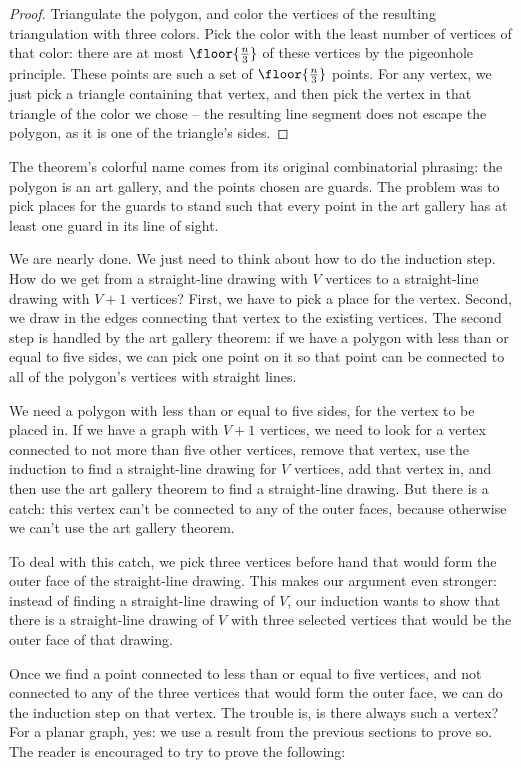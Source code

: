 \documentclass[11pt,paper=letter]{scrartcl}
\begin{document}
\begin{proof}
Triangulate the polygon, and color the vertices of the resulting triangulation with three colors. Pick the color with the least number of vertices of that color: there are at most $\floor{\frac{n}{3}}$ of these vertices by the pigeonhole principle. These points are such a set of $\floor{\frac{n}{3}}$ points. For any vertex, we just pick a triangle containing that vertex, and then pick the vertex in that triangle of the color we chose -- the resulting line segment does not escape the polygon, as it is one of the triangle's sides.
\end{proof}

The theorem's colorful name comes from its original combinatorial phrasing: the polygon is an art gallery, and the points chosen are guards. The problem was to pick places for the guards to stand such that every point in the art gallery has at least one guard in its line of sight.

We are nearly done. We just need to think about how to do the induction step. How do we get from a straight-line drawing with $V$ vertices to a straight-line drawing with $V + 1$ vertices? First, we have to pick a place for the vertex. Second, we draw in the edges connecting that vertex to the existing vertices. The second step is handled by the art gallery theorem: if we have a polygon with less than or equal to five sides, we can pick one point on it so that point can be connected to all of the polygon's vertices with straight lines.

We need a polygon with less than or equal to five sides, for the vertex to be placed in. If we have a graph with $V + 1$ vertices, we need to look for a vertex connected to not more than five other vertices, remove that vertex, use the induction to find a straight-line drawing for $V$ vertices, add that vertex in, and then use the art gallery theorem to find a straight-line drawing. But there is a catch: this vertex can't be connected to any of the outer faces, because otherwise we can't use the art gallery theorem.

To deal with this catch, we pick three vertices before hand that would form the outer face of the straight-line drawing. This makes our argument even stronger: instead of finding a straight-line drawing of $V$, our induction wants to show that there is a straight-line drawing of $V$ with three selected vertices that would be the outer face of that drawing.

Once we find a point connected to less than or equal to five vertices, and not connected to any of the three vertices that would form the outer face, we can do the induction step on that vertex. The trouble is, is there always such a vertex? For a planar graph, yes: we use a result from the previous sections to prove so. The reader is encouraged to try to prove the following:
\end{document}
